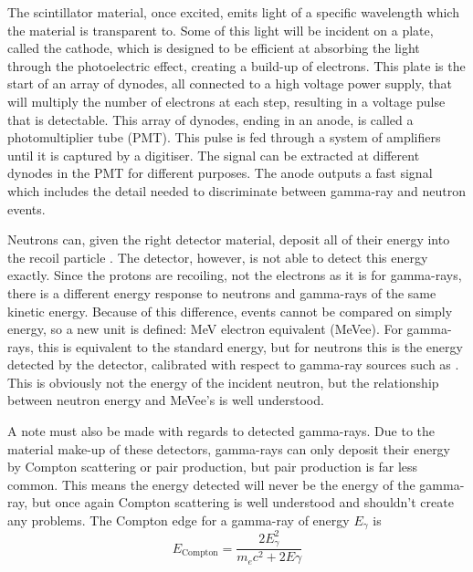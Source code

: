 \documentclass[11pt]{article}
\numberwithin{equation}{section}
\numberwithin{figure}{section}
\numberwithin{table}{section}
\begin{document}
\newline
\par The scintillator material, once excited, emits light of a specific wavelength which the material is transparent to. Some of this light will be incident on a plate, called the cathode, which is designed to be efficient at absorbing the light through the photoelectric effect, creating a build-up of electrons. This plate is the start of an array of dynodes, all connected to a high voltage power supply, that will multiply the number of electrons at each step, resulting in a voltage pulse that is detectable. This array of dynodes, ending in an anode, is called a photomultiplier tube (PMT). This pulse is fed through a system of amplifiers until it is captured by a digitiser. The signal can be extracted at different dynodes in the PMT for different purposes. The anode outputs a fast signal which includes the detail needed to discriminate between gamma-ray and neutron events.
\newline
\par Neutrons can, given the right detector material, deposit all of their energy into the recoil particle \cite{Knoll}. The detector, however, is not able to detect this energy exactly. Since the protons are recoiling, not the electrons as it is for gamma-rays, there is a different energy response to neutrons and gamma-rays of the same kinetic energy. Because of this difference, events cannot be compared on simply energy, so a new unit is defined: MeV electron equivalent (MeVee). For gamma-rays, this is equivalent to the standard energy, but for neutrons this is the energy detected by the detector, calibrated with respect to gamma-ray sources such as . This is obviously not the energy of the incident neutron, but the relationship between neutron energy and MeVee's is well understood. 
\par A note must also be made with regards to detected gamma-rays. Due to the material make-up of these detectors, gamma-rays can only deposit their energy by Compton scattering or pair production, but pair production is far less common. This means the energy detected will never be the energy of the gamma-ray, but once again Compton scattering is well understood and shouldn't create any problems. The Compton edge for a gamma-ray of energy $E_\gamma$ is
\begin{equation}
    E_{\mathrm{Compton}} = \frac{2E_\gamma^2}{m_ec^2+2E\gamma}
    \label{eqn:Compton Edge}
\end{equation}
\end{document}
